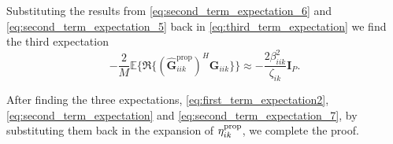 \documentclass[10pt,journal,comsoc,final]{IEEEtran}
\begin{document}
Substituting the results from \eqref{eq:second_term_expectation_6} and \eqref{eq:second_term_expectation_5} back in \eqref{eq:third_term_expectation} we find the third expectation
\begin{equation}\label{eq:second_term_expectation_7}
-\frac{2}{M} \mathbb{E} \{\mathfrak{R}\{ (\hat{\textbf{G}}_{iik}^{\text{prop}})^{H} \textbf{G}_{iik} \}\} \approx -\frac{2 \beta_{iik}^{2}}{\zeta_{ik}} \textbf{I}_{P}.
\end{equation}

After finding the three expectations, \eqref{eq:first_term_expectation2}, \eqref{eq:second_term_expectation} and \eqref{eq:second_term_expectation_7}, by substituting them back in the expansion of $\eta_{ik}^{\text{\text{prop}}}$, we complete the proof.

\end{document}
